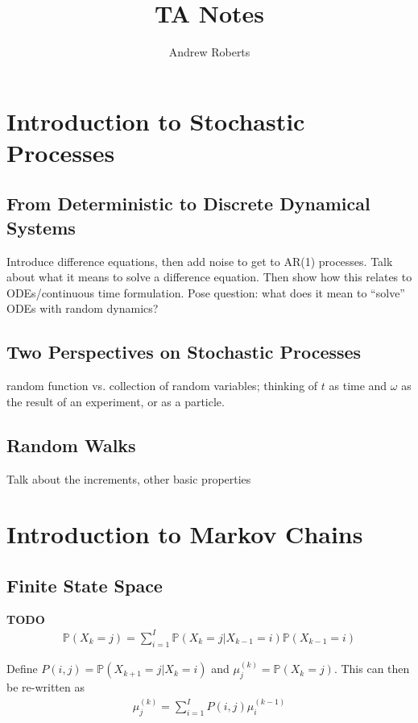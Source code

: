\documentclass[12pt]{article}
\title{TA Notes}
\author{Andrew Roberts}
\newcommand{\Prob}{\mathbb{P}}
\begin{document}
\maketitle
\tableofcontents
\newpage

\section{Introduction to Stochastic Processes}

\subsection{From Deterministic to Discrete Dynamical Systems}
Introduce difference equations, then add noise to get to AR(1) processes. Talk about what it means to solve a difference equation. Then show how this 
relates to ODEs/continuous time formulation. Pose question: what does it mean to ``solve'' ODEs with random dynamics? 

\subsection{Two Perspectives on Stochastic Processes}
random function vs. collection of random variables; thinking of $t$ as time and $\omega$ as the result of an experiment, or as a particle. 

\subsection{Random Walks}
Talk about the increments, other basic properties 

\section{Introduction to Markov Chains}

\subsection{Finite State Space}
\textbf{TODO}
\begin{align}
\Prob(X_k = j) = \sum_{i = 1}^{I} \Prob(X_k = j|X_{k - 1} = i)\Prob(X_{k - 1} = i)
\end{align}

Define $P(i, j) = \Prob(X_{k+1} = j|X_k = i)$ and $\mu^{(k)}_j = \Prob(X_k = j)$. This can then be re-written as 
\begin{align}
\mu^{(k)}_j = \sum_{i = 1}^{I} P(i, j) \mu^{(k-1)}_i \label{discrete_transition}
\end{align}
\end{document}
